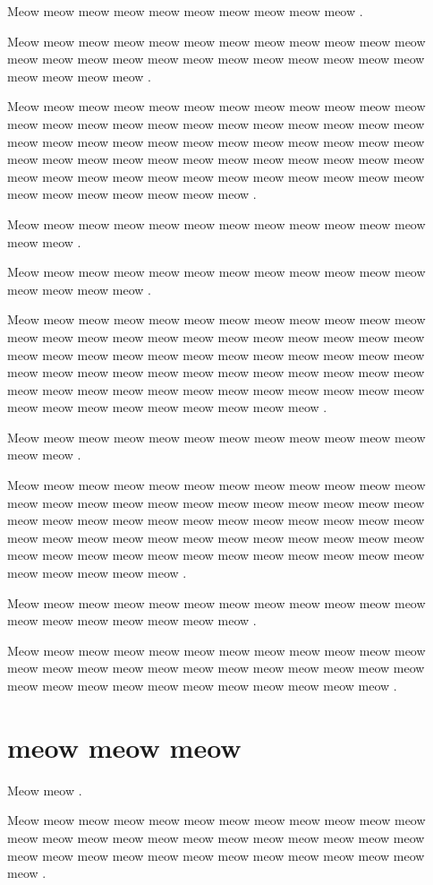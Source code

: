 \documentclass[12pt, a5paper, openany]{book}
\begin{document}
Meow meow meow meow meow meow meow meow meow meow .

Meow meow meow meow meow meow meow meow meow meow meow meow meow meow meow meow meow meow meow meow meow meow meow meow meow meow meow meow .

Meow meow meow meow meow meow meow meow meow meow meow meow meow meow meow meow meow meow meow meow meow meow meow meow meow meow meow meow meow meow meow meow meow meow meow meow meow meow meow meow meow meow meow meow meow meow meow meow meow meow meow meow meow meow meow meow meow meow meow meow meow meow meow meow meow meow meow .

Meow meow meow meow meow meow meow meow meow meow meow meow meow meow .

Meow meow meow meow meow meow meow meow meow meow meow meow meow meow meow meow .

Meow meow meow meow meow meow meow meow meow meow meow meow meow meow meow meow meow meow meow meow meow meow meow meow meow meow meow meow meow meow meow meow meow meow meow meow meow meow meow meow meow meow meow meow meow meow meow meow meow meow meow meow meow meow meow meow meow meow meow meow meow meow meow meow meow meow meow meow meow .

Meow meow meow meow meow meow meow meow meow meow meow meow meow meow .

Meow meow meow meow meow meow meow meow meow meow meow meow meow meow meow meow meow meow meow meow meow meow meow meow meow meow meow meow meow meow meow meow meow meow meow meow meow meow meow meow meow meow meow meow meow meow meow meow meow meow meow meow meow meow meow meow meow meow meow meow meow meow meow meow meow .

Meow meow meow meow meow meow meow meow meow meow meow meow meow meow meow meow meow meow meow .

Meow meow meow meow meow meow meow meow meow meow meow meow meow meow meow meow meow meow meow meow meow meow meow meow meow meow meow meow meow meow meow meow meow meow meow .



\chapter{meow meow meow }Meow meow .

Meow meow meow meow meow meow meow meow meow meow meow meow meow meow meow meow meow meow meow meow meow meow meow meow meow meow meow meow meow meow meow meow meow meow meow meow meow .
\end{document}
